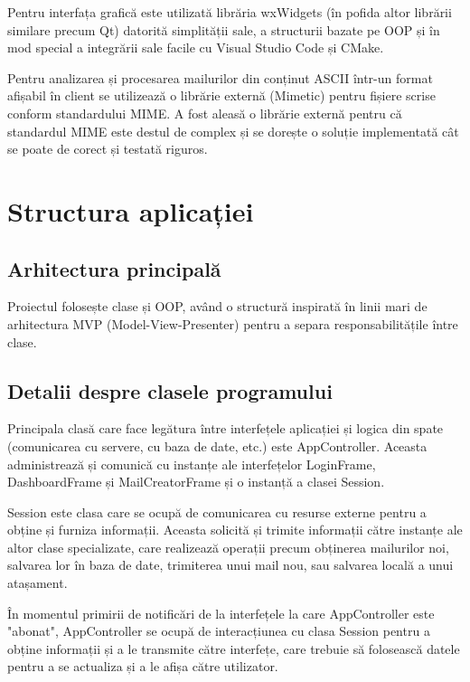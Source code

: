 \documentclass[runningheads]{llncs}
\begin{document}
Pentru interfața grafică este utilizată librăria wxWidgets (în pofida altor librării similare precum Qt) datorită simplității sale, a structurii bazate pe OOP și în mod special a integrării sale facile cu Visual Studio Code și CMake.

Pentru analizarea și procesarea mailurilor din conținut ASCII într-un format afișabil în client se utilizează o librărie externă (Mimetic) pentru fișiere scrise conform standardului MIME\cite{ref_rfc_mime}. A fost aleasă o librărie externă pentru că standardul MIME este destul de complex și se dorește o soluție implementată cât se poate de corect și testată riguros.



\section{Structura aplicației}


\subsection{Arhitectura principală}

Proiectul folosește clase și OOP, având o structură inspirată în linii mari de arhitectura MVP (Model-View-Presenter) pentru a separa responsabilitățile între clase.



\subsection{Detalii despre clasele programului}


Principala clasă care face legătura între interfețele aplicației și logica din spate (comunicarea cu servere, cu baza de date, etc.) este AppController. Aceasta administrează și comunică cu instanțe ale interfețelor LoginFrame, DashboardFrame și MailCreatorFrame și o instanță a clasei Session.

Session este clasa care se ocupă de comunicarea cu resurse externe pentru a obține și furniza informații. Aceasta solicită și trimite informații către instanțe ale altor clase specializate, care realizează operații precum obținerea mailurilor noi, salvarea lor în baza de date, trimiterea unui mail nou, sau salvarea locală a unui atașament.

În momentul primirii de notificări de la interfețele la care AppController este "abonat", AppController se ocupă de interacțiunea cu clasa Session pentru a obține informații și a le transmite către interfețe, care trebuie să folosească datele pentru a se actualiza și a le afișa către utilizator.
\end{document}

